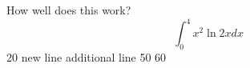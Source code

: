 \documentclass{article}
\begin{document}
How well does this work?
$$\int_0^4 x^2 \ln{2x}dx$$
20
new line
additional line
50
60
\end{document}
